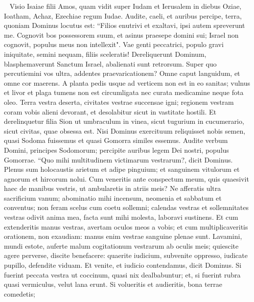 
\begin{biblechapter}   
\verse Visio Isaiae filii Amos, quam vidit super Iudam et Ierusalem in diebus Oziae, Ioatham, Achaz, Ezechiae regum Iudae. 
\verse Audite, caeli, et auribus percipe, terra, quoniam Dominus locutus est: “Filios enutrivi et exaltavi, ipsi autem spreverunt me. 
\verse Cognovit bos possessorem suum, et asinus praesepe domini sui; Israel non cognovit, populus meus non intellexit". 
\verse Vae genti peccatrici, populo gravi iniquitate, semini nequam, filiis sceleratis! Dereliquerunt Dominum, blasphemaverunt Sanctum Israel, abalienati sunt retrorsum. 
\verse Super quo percutiemini vos ultra, addentes praevaricationem? Omne caput languidum, et omne cor maerens. 
\verse A planta pedis usque ad verticem non est in eo sanitas; vulnus et livor et plaga tumens non est circumligata nec curata medicamine neque fota oleo. 
\verse Terra vestra deserta, civitates vestrae succensae igni; regionem vestram coram vobis alieni devorant, et desolabitur sicut in vastitate hostili. 
\verse Et derelinquetur filia Sion ut umbraculum in vinea, sicut tugurium in cucumerario, sicut civitas, quae obsessa est. 
\verse Nisi Dominus exercituum reliquisset nobis semen, quasi Sodoma fuissemus et quasi Gomorra similes essemus. 
\verse Audite verbum Domini, principes Sodomorum; percipite auribus legem Dei nostri, populus Gomorrae. 
\verse “Quo mihi multitudinem victimarum vestrarum?, dicit Dominus. Plenus sum holocaustis arietum et adipe pinguium; et sanguinem vitulorum et agnorum et hircorum nolui. 
\verse Cum veneritis ante conspectum meum, quis quaesivit haec de manibus vestris, ut ambularetis in atriis meis? 
\verse Ne afferatis ultra sacrificium vanum; abominatio mihi incensum, neomenia et sabbatum et conventus; non feram scelus cum coetu sollemni; 
\verse calendas vestras et sollemnitates vestras odivit anima mea, facta sunt mihi molesta, laboravi sustinens. 
\verse Et cum extenderitis manus vestras, avertam oculos meos a vobis; et cum multiplicaveritis orationem, non exaudiam: manus enim vestrae sanguine plenae sunt. 
\verse Lavamini, mundi estote, auferte malum cogitationum vestrarum ab oculis meis; quiescite agere perverse, 
\verse discite benefacere: quaerite iudicium, subvenite oppresso, iudicate pupillo, defendite viduam. 
\verse Et venite, et iudicio contendamus, dicit Dominus. Si fuerint peccata vestra ut coccinum, quasi nix dealbabuntur; et, si fuerint rubra quasi vermiculus, velut lana erunt. 
\verse Si volueritis et audieritis, bona terrae comedetis; 

\end{biblechapter}
